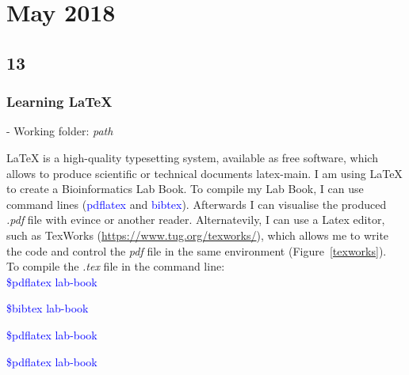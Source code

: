 \documentclass[12pt, a4paper]{report}
\title{\titulo}
\author{\autor}
\date{2018}
\newcommand{\command}[1]{\textcolor{blue}{#1}}
\begin{document}
 \maketitle
 \tableofcontents
 \newpage


 \chapter{May 2018}
 
 \section{13}
 \subsection{Learning \LaTeX}
 \hspace{0.2cm}
 \begin{tcolorbox}[width=6.3in]
 \scriptsize 
 - Working folder: \textit{path}
 \end{tcolorbox}
 \hspace{0.2cm}
 \normalsize  
 
  \LaTeX{} is a high-quality typesetting system, available as free software, which allows to produce scientific or technical documents latex-main. I am using \LaTeX{} to create a Bioinformatics Lab Book. To compile my Lab Book, I can use command lines (\command{pdflatex} and \command{bibtex}). Afterwards I can visualise the produced {\it .pdf} file with evince or another reader. Alternatevily, I can use a Latex editor, such as TexWorks (\url{https://www.tug.org/texworks/}), which allows me to write the code and control the {\it pdf} file in the same environment (Figure~\ref{texworks}).  \\
  
  
  To compile the {\it .tex} file in the command line: \\
  
  \command{\$pdflatex lab-book}
  
  \command{\$bibtex lab-book}
  
  \command{\$pdflatex lab-book}
    
  \command{\$pdflatex lab-book} \\
  
\end{document}

